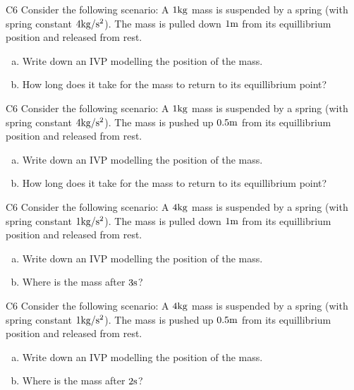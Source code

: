 \begin{problem}{C6}
Consider the following scenario:
A \(1 {\rm kg}\) mass is suspended by a spring (with spring constant \(4 {\rm kg /s^2}\)).  The mass is pulled down \(1 {\rm m}\) from its equillibrium position and released from rest.  
\begin{enumerate}[(a)]
\item Write down an IVP modelling the position of the mass.
\item How long does it take for the mass to return to its equillibrium point?
\end{enumerate}
\end{problem}

\begin{problem}{C6}
Consider the following scenario:
A \(1 {\rm kg}\) mass is suspended by a spring (with spring constant \(4 {\rm kg /s^2}\)).  The mass is pushed up \(0.5 {\rm m}\) from its equillibrium position and released from rest.  
\begin{enumerate}[(a)]
\item Write down an IVP modelling the position of the mass.
\item How long does it take for the mass to return to its equillibrium point?
\end{enumerate}
\end{problem}

\begin{problem}{C6}
Consider the following scenario:
A \(4 {\rm kg}\) mass is suspended by a spring (with spring constant \(1 {\rm kg /s^2}\)).  The mass is pulled down \(1 {\rm m}\) from its equillibrium position and released from rest.  
\begin{enumerate}[(a)]
\item Write down an IVP modelling the position of the mass.
\item Where is the mass after \(3 {\rm s}\)?
\end{enumerate}
\end{problem}

\begin{problem}{C6}
Consider the following scenario:
A \(4 {\rm kg}\) mass is suspended by a spring (with spring constant \(1 {\rm kg /s^2}\)).  The mass is pushed up \(0.5 {\rm m}\) from its equillibrium position and released from rest.  
\begin{enumerate}[(a)]
\item Write down an IVP modelling the position of the mass.
\item Where is the mass after \(2 {\rm s}\)?
\end{enumerate}
\end{problem}

